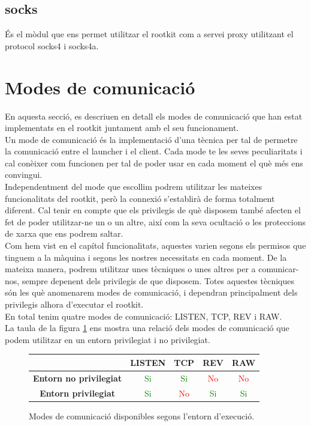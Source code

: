 \subsection{socks}

És el mòdul que ens permet utilitzar el rootkit com a servei proxy utilitzant el protocol socks4 i socks4a.
\section{Modes de comunicació}

En aquesta secció, es descriuen en detall els modes de comunicació que han estat implementats en el
rootkit juntament amb el seu funcionament. \\

Un mode de comunicació és la implementació d'una tècnica per tal de permetre la comunicació entre el
launcher i el client. Cada mode te les seves peculiaritats i cal conèixer com funcionen per tal de 
poder usar en cada moment el què més ens convingui. \\

Independentment del mode que escollim podrem utilitzar les mateixes funcionalitats del rootkit, però 
la connexió s'establirà de forma totalment diferent. Cal tenir en compte que els privilegis de què 
disposem també afecten el fet de poder utilitzar-ne un o un altre, així com la seva ocultació o les 
proteccions de xarxa que ens podrem saltar. \\

Com hem vist en el capítol funcionalitats, aquestes varien segons els permisos que tinguem a la màquina 
i segons les nostres necessitats en cada moment. De la mateixa manera, podrem utilitzar unes tècniques o unes altres
per a comunicar-nos, sempre depenent dels privilegis de que disposem. Totes aquestes tècniques són les què anomenarem modes
de comunicació, i dependran principalment dels privilegis alhora d'executar el rootkit.\\

En total tenim quatre modes de comunicació: LISTEN, TCP, REV i RAW. \\

La taula de la figura  \ref{fig:tableModesRelation} ens mostra una relació dels modes de comunicació que podem utilitzar
en un entorn privilegiat i no privilegiat.

\begin{figure}[htp]
    \centering
    \begin{tabular}{|c|c|c|c|c|}
        \hline
         & \textbf{LISTEN} & \textbf{TCP} & \textbf{REV} & \textbf{RAW} \\ \hline
         \textbf{Entorn no privilegiat} & \textcolor{Green}{Si} & \textcolor{Green}{Si} & \textcolor{Red}{No} & \textcolor{Red}{No} \\ \hline
         \textbf{Entorn privilegiat} & \textcolor{Green}{Si} & \textcolor{Red}{No} & \textcolor{Green}{Si} & \textcolor{Green}{Si} \\ \hline
    \end{tabular}
    \caption{Modes de comunicació disponibles segons l'entorn d'execució.}
    \label{fig:tableModesRelation}
\end{figure}


